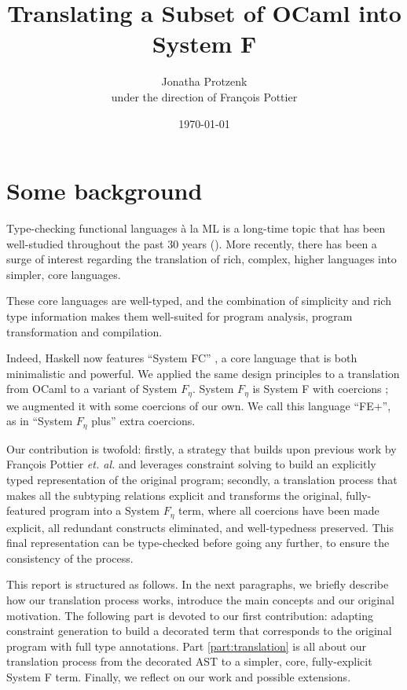 \documentclass[10pt,a4paper,twoside,titlepage,twocolumn]{article}
\title{Translating a Subset of OCaml into System F}
\author{Jonatha\wf{n} Protzenk\wf{o}\\under the direction of François Pottier}
\date{\today}
\begin{document}
{
\maketitle}
\tableofcontents

\part{Some background}

Type-checking functional languages à la ML is a long-time topic that has been
well-studied throughout the past 30 years
(\cite{gordon1978metalanguage,damas1982principal}). More
recently, there has been a surge of interest regarding the translation of rich,
complex, higher languages into simpler, core languages.

These core languages are well-typed, and the combination of simplicity and rich
type information makes them well-suited for program analysis, program
transformation and compilation.

Indeed, Haskell now features ``System FC'' \cite{sulzmann2007system}, a core
language that is both minimalistic and powerful. We applied the same design
principles to a translation from OCaml \cite{ocaml} to a variant of System
$F_{\eta}$. System $F_\eta$ is System F with coercions \cite{mitchell-88}; we
augmented it with some coercions of our own. We call this language ``FE+'', as
in ``System $F_\eta$ plus'' extra coercions.

Our contribution is twofold: firstly, a strategy that builds upon previous work by
François Pottier \emph{et. al.} \cite{pottier2005essence} and leverages
constraint solving to build an explicitly typed representation of the original
program; secondly, a translation process that makes all the subtyping
relations explicit and transforms the original, fully-featured program into a System
$F_{\eta}$ term, where all coercions have been made explicit, all redundant
constructs eliminated, and well-typedness preserved. This final representation
can be type-checked before going any further, to ensure the consistency of the
process.

This report is structured as follows. In the next paragraphs, we briefly
describe how our translation process works, introduce the main concepts and our
original motivation. The following part is devoted to our first contribution:
adapting constraint generation to build a decorated term that corresponds to the
original program with full type annotations. Part \ref{part:translation} is all
about our translation process from the decorated AST to a simpler, core,
fully-explicit System F term. Finally, we reflect on our work and possible
extensions.
\end{document}
